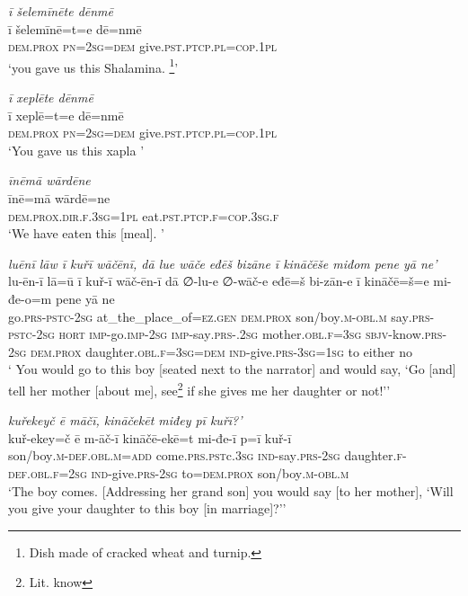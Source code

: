 \ea \label{ŽE.51}
\textit{ī šelemīnēte dēnmē} \\ 
\gll ī šelemīnē=t=e dē=nmē \\ 
 \textsc{dem.prox} \textsc{pn}\textsc{=\textsc{2sg}}\textsc{=dem} give\textsc{.pst}\textsc{.ptcp}\textsc{.pl}\textsc{=cop}\textsc{.1pl} \\ 
\glt `you gave us this Shalamina. \footnote{Dish made of cracked wheat and turnip.}'
\z 
 
\ea \label{ŽE.52}
\textit{ī xeplēte dēnmē} \\ 
\gll ī xeplē=t=e dē=nmē \\ 
 \textsc{dem.prox} \textsc{pn}\textsc{=\textsc{2sg}}\textsc{=dem} give\textsc{.pst}\textsc{.ptcp}\textsc{.pl}\textsc{=cop}\textsc{.1pl} \\ 
\glt `You gave us this xapla '
\z 
 
\ea \label{ŽE.53}
\textit{īnēmā wārdēne} \\ 
\gll īnē=mā wārdē=ne \\ 
 \textsc{dem.prox}\textsc{.dir}\textsc{.f}\textsc{.3sg}\textsc{=1pl} eat\textsc{.pst}\textsc{.ptcp}\textsc{.f}\textsc{=cop}\textsc{.3sg}\textsc{.f} \\ 
\glt `We have eaten this [meal]. '
\z 
 
\ea \label{ŽE.74}
\textit{luēnī lāw ī kuřī wāčēnī, dā lue wāče eđēš bizāne ī kināčēše miđom pene yā ne’} \\ 
\gll lu-ēn-ī lā=ū ī kuř-ī wāč-ēn-ī dā ∅-lu-e ∅-wāč-e eđē=š bi-zān-e ī kināčē=š=e mi-đe-o=m pene yā ne \\ 
 go\textsc{.prs}\textsc{-pstc}-\textsc{2sg} at\_the\_place\_of\textsc{\textsc{=ez.gen}} \textsc{dem.prox} son/boy\textsc{.m}\textsc{-obl}\textsc{.m} say\textsc{.prs}\textsc{-pstc}-\textsc{2sg} \textsc{hort} \textsc{imp-}go.\textsc{imp-}\textsc{2sg} \textsc{imp-}say\textsc{.prs-}.\textsc{2sg} mother\textsc{.obl}\textsc{.f}\textsc{=3sg} \textsc{sbjv-}know\textsc{.prs}-\textsc{2sg} \textsc{dem.prox} daughter\textsc{.obl}\textsc{.f}\textsc{=3sg}\textsc{=dem} \textsc{ind-}give\textsc{.prs}\textsc{-3sg}\textsc{=\textsc{1sg}} to either no \\ 
\glt ` You would go to this boy [seated next to the narrator] and would say, ‘Go [and] tell her mother [about me], see\footnote{Lit. know} if she gives me her daughter or not!’'
\z 
 
\ea \label{ŽE.75}
\textit{kuřekeyč ē māčī, kināčekēt miđey pī kuřī?’} \\ 
\gll kuř-ekey=č ē m-āč-ī kināčē-ekē=t mi-đe-ī p=ī kuř-ī \\ 
 son/boy\textsc{.m}\textsc{-def}\textsc{.obl}\textsc{.m}\textsc{=add} come\textsc{.prs}\textsc{.pst}c\textsc{.3sg} \textsc{ind-}say\textsc{.prs}-\textsc{2sg} daughter\textsc{.f}\textsc{-def}\textsc{.obl}\textsc{.f}\textsc{=\textsc{2sg}} \textsc{ind-}give\textsc{.prs}-\textsc{2sg} to=\textsc{dem.prox} son/boy\textsc{.m}\textsc{-obl}\textsc{.m} \\ 
\glt `The boy comes. [Addressing her grand son] you would say [to her mother], ‘Will you give your daughter to this boy [in marriage]?’'
\z 
 
